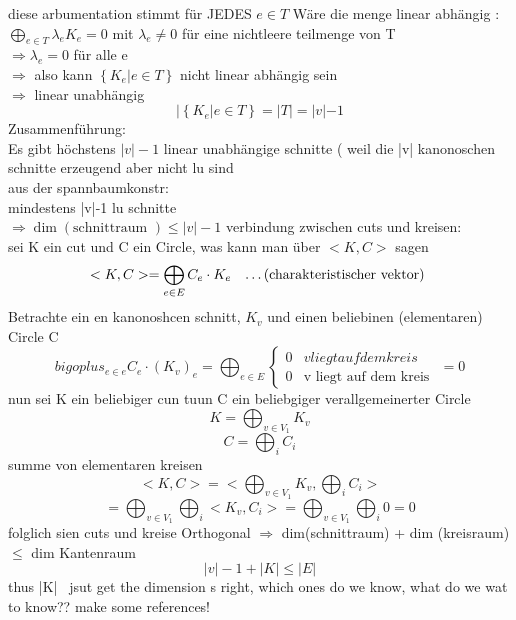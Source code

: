 \documentclass[a4paper]{article}
\theoremstyle{definition}
\theoremstyle{remark}
\begin{document}
diese arbumentation stimmt für JEDES $e\in T$
Wäre die menge linear abhängig :\\
$\bigoplus _{e\in T} \lambda _e K_e=0$ mit $ \lambda _e\neq 0$ für eine nichtleere teilmenge von T\\
$\Rightarrow \lambda _e=0$ für alle e\\
$ \Rightarrow $ also kann $ \left\{ K_e|e\in T \right\}$ nicht linear abhängig sein\\
$ \Rightarrow$ linear unabhängig\\
\begin{equation*}
|\left\{ K_e|e\in T  \right\}=|T|= |v|-1
\end{equation*}
Zusammenführung:\\
Es gibt höchstens $|v|-1$ linear unabhängige schnitte ( weil die |v| kanonoschen schnitte erzeugend aber nicht lu sind\\
  aus der spannbaumkonstr:\\
  mindestens |v|-1 lu schnitte\\
  $\Rightarrow \dim(\textrm{schnittraum })\leq |v|-1$
verbindung zwischen cuts und kreisen:\\
sei  K ein cut und C ein Circle, 
was kann man über $<K,C>$ sagen 
\begin{equation*}
  <K,C>= \bigoplus_{e\in E} C_e\cdot K_e \quad \textrm{\dots(charakteristischer vektor) }
\end{equation*}
Betrachte ein en kanonoshcen schnitt, $K_v$ und einen beliebinen (elementaren) Circle C
\begin{equation*}
  bigoplus _{e\in e}C_e\cdot(K_v)_e= \bigoplus_{e\in E} 
  \begin{cases}
    0 & v liegt auf dem kreis \\
    0 & \textrm{v liegt auf dem kreis }
  \end{cases}=0
\end{equation*}
nun sei K ein beliebiger cun tuun C ein beliebgiger verallgemeinerter  Circle
\begin{equation*}
  K= \bigoplus_{v\in V_1}K_v
\end{equation*}
\begin{equation*}
  C= \bigoplus_i C_i
\end{equation*}
summe von elementaren kreisen
\begin{equation*}
  	<K,C>= <\bigoplus_{v\in V_1}K_v,\bigoplus_i C_i>
\end{equation*}
\begin{equation*}
  = \bigoplus_{v\in V_1}\bigoplus_i<K_v,C_i>= \bigoplus_{v\in V_1}\bigoplus_i 0=0
\end{equation*}
folglich sien cuts und kreise Orthogonal
$\Rightarrow$ dim(schnittraum) + dim (kreisraum) $\leq$ dim Kantenraum
\begin{equation*}
  	|v|-1  + |K| \leq |E| 
\end{equation*}
thus  |K| \
jsut get the dimension s right, which ones do we know, what do we wat to know?? make some references!
\end{document}
